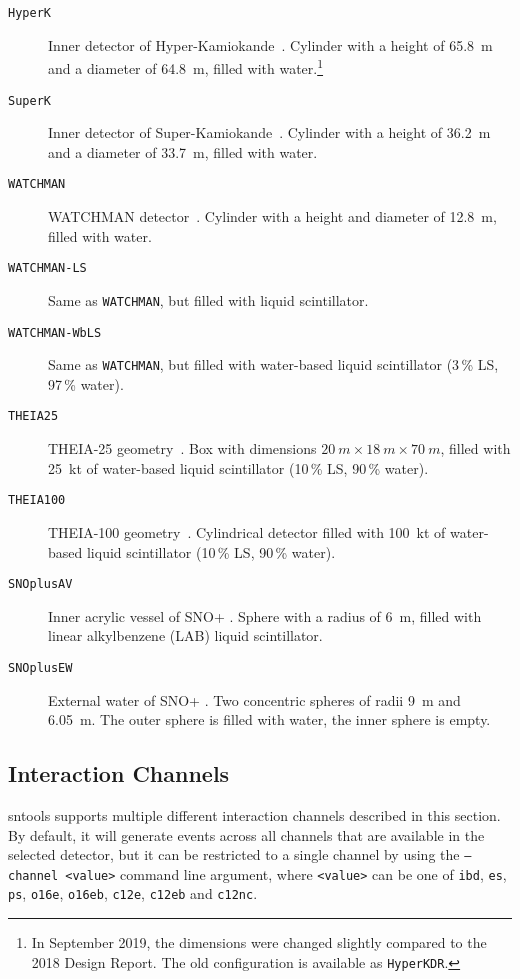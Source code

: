 \documentclass[11pt, oneside]{article}
\begin{document}
\begin{description}
\item[\texttt{HyperK}] Inner detector of Hyper-Kamiokande~\cite{HKDR2018}. Cylinder with a height of \SI{65.8}{m} and a diameter of \SI{64.8}{m}, filled with water.\footnote{In September 2019, the dimensions were changed slightly compared to the 2018 Design Report. The old configuration is available as \texttt{HyperKDR}.}
\item[\texttt{SuperK}] Inner detector of Super-Kamiokande~\cite{Fukuda2003}. Cylinder with a height of \SI{36.2}{m} and a diameter of \SI{33.7}{m}, filled with water.
\item[\texttt{WATCHMAN}] WATCHMAN detector~\cite{Askins2015}. Cylinder with a height and diameter of \SI{12.8}{m}, filled with water.
\item[\texttt{WATCHMAN-LS}] Same as \texttt{WATCHMAN}, but filled with liquid scintillator.
\item[\texttt{WATCHMAN-WbLS}] Same as \texttt{WATCHMAN}, but filled with water-based liquid scintillator (3\,\% LS, 97\,\% water).
\item[\texttt{THEIA25}] THEIA-25 geometry~\cite{Askins2020}. Box with dimensions $\SI{20}{m}\times\SI{18}{m}\times\SI{70}{m}$, filled with \SI{25}{kt} of water-based liquid scintillator (10\,\% LS, 90\,\% water).
\item[\texttt{THEIA100}] THEIA-100 geometry~\cite{Askins2020}. Cylindrical detector filled with \SI{100}{kt} of water-based liquid scintillator (10\,\% LS, 90\,\% water).
\item[\texttt{SNOplusAV}] Inner acrylic vessel of SNO+ \cite{albanese2021sno+}. Sphere with a radius of \SI{6}{m}, filled with linear alkylbenzene (LAB) liquid scintillator.
\item[\texttt{SNOplusEW}] External water of SNO+ \cite{albanese2021sno+}. Two concentric spheres of radii \SI{9}{m} and \SI{6.05}{m}. The outer sphere is filled with water, the inner sphere is empty.
\end{description}


\subsection{Interaction Channels} \label{sec:interaction-channels}
sntools supports multiple different interaction channels described in this section.
By default, it will generate events across all channels that are available in the selected detector, but it can be restricted to a single channel by using the \texttt{--channel <value>} command line argument, where \texttt{<value>} can be one of \texttt{ibd}, \texttt{es}, \texttt{ps}, \texttt{o16e}, \texttt{o16eb}, \texttt{c12e}, \texttt{c12eb} and \texttt{c12nc}.
\end{document}
